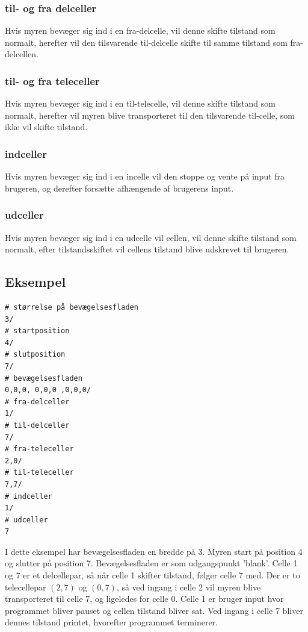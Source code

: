 \documentclass[11pt]{article}
\begin{document}
\subsubsection{til- og fra delceller}
Hvis myren bevæger sig ind i en fra-delcelle, vil denne skifte tilstand som normalt, herefter vil den tilsvarende til-delcelle skifte til samme tilstand som fra-delcellen.

\subsubsection{til- og fra teleceller}
Hvis myren bevæger sig ind i en til-telecelle, vil denne skifte tilstand som normalt, herefter vil myren blive transporteret til den tilsvarende til-celle, som ikke vil skifte tilstand.

\subsubsection{indceller}
Hvis myren bevæger sig ind i en incelle vil den stoppe og vente på input fra brugeren, og derefter forsætte afhængende af brugerens input.

\subsubsection{udceller}
Hvis myren bevæger sig ind i en udcelle vil cellen, vil denne skifte tilstand som normalt, efter tilstandsskiftet vil cellens tilstand blive udskrevet til brugeren.

\subsection{Eksempel}

\begin{verbatim}
# størrelse på bevægelsesfladen
3/
# startposition
4/
# slutposition
7/
# bevægelsesfladen
0,0,0, 0,0,0 ,0,0,0/
# fra-delceller
1/
# til-delceller
7/
# fra-teleceller
2,0/
# til-teleceller
7,7/
# indceller
1/
# udceller
7
\end{verbatim}

I dette eksempel har bevægelsesfladen en bredde på 3. Myren start på position 4 og slutter på position 7. Bevægelsesfladen er som udgangspunkt 'blank'. Celle 1 og 7 er et delcellepar, så når celle 1 skifter tilstand, følger celle 7 med. Der er to telecellepar $(2, 7)$ og $(0, 7)$, så ved ingang i celle 2 vil myren blive transporteret til celle 7, og ligeledes for celle 0. Celle 1 er bruger input hvor programmet bliver pauset og cellen tilstand bliver sat. Ved ingang i celle 7 bliver dennes tilstand printet, hvorefter programmet terminerer. 
\end{document}
